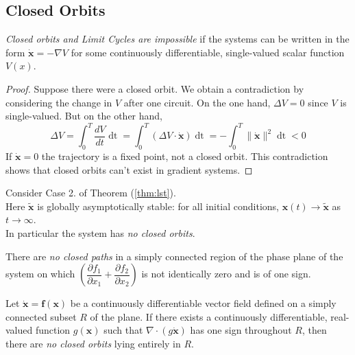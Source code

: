 \subsection{Closed Orbits}
\begin{theorem}
	\emph{Closed orbits and Limit Cycles are impossible} if the systems can be written in the form $\mathbf{\dot{x}}=-\nabla V$ for some continuously differentiable, single-valued scalar function $V(x)$. 
\end{theorem}
\begin{proof}
	Suppose there were a closed orbit. We obtain a contradiction by considering the change in $V$ after one circuit.
	On the one hand, $\Delta V=0$ since $V$ is single-valued.
	But on the other hand,
	\begin{equation}
		\Delta V=\int_0^T\frac{dV}{dt}\mathop{dt}=\int_0^T(\Delta V\cdot\mathbf{\dot{x}})\mathop{dt}=-\int_0^T\|\mathbf{\dot{x}}\|^2\mathop{dt}<0 
	\end{equation}
	If $\mathbf{\dot{x}}=0$ the trajectory is a fixed point, not a closed orbit.
	This contradiction shows that closed orbits can’t exist in gradient systems. 
\end{proof}
\begin{theorem}
	Consider Case 2. of Theorem (\ref{thm:lst}).\\
	Here $\mathbf{\tilde{x}}$ is globally asymptotically stable: for all initial conditions, $\mathbf{x}(t)\rightarrow\mathbf{\tilde{x}}$ as $t\rightarrow\infty$.\\
	In particular the system has \emph{no closed orbits}.
\end{theorem}
\begin{theorem}
	There are \emph{no closed paths} in a simply connected region of the phase plane of the system on which $\left(\dfrac{\partial f_1}{\partial x_1}+\dfrac{\partial f_2}{\partial x_2}\right)$ is not identically zero and is of one sign.
\end{theorem}
\begin{theorem}
	Let $\mathbf{\dot{x}}=\mathbf{f(x)}$ be a continuously differentiable vector field defined on a simply connected subset $R$ of the plane.
	If there exists a continuously differentiable, real-valued function $g(\mathbf{x})$ such that $\nabla\cdot(g\mathbf{\dot{x}})$ has one sign throughout $R$, then there are \emph{no closed orbits} lying entirely in $R$.
\end{theorem}
